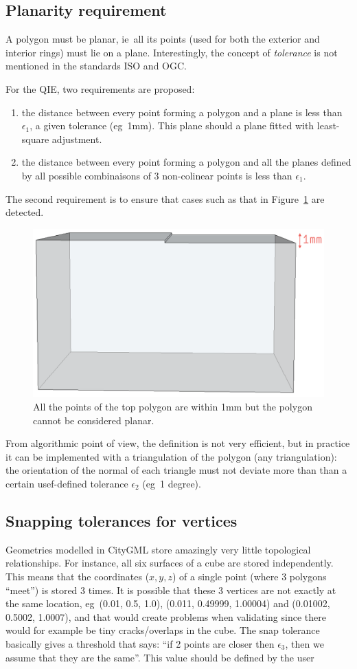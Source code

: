 \documentclass[a4paper,parskip=half,11pt]{scrartcl}
\newcommand{\ie}{ie}
\newcommand{\eg}{eg}
\begin{document}
\subsection{Planarity requirement}

A polygon must be planar, \ie\ all its points (used for both the exterior and interior rings) must lie on a plane.
Interestingly, the concept of \emph{tolerance} is not mentioned in the standards ISO and OGC\@.

For the QIE, two requirements are proposed:
\begin{enumerate}
  \item the distance between every point forming a polygon and a plane is less than $\epsilon_1$, a given tolerance (\eg\ 1mm).
  This plane should a plane fitted with least-square adjustment. 
  \item the distance between every point forming a polygon and all the planes defined by all possible combinaisons of 3 non-colinear points is less than $\epsilon_1$.
\end{enumerate}

The second requirement is to ensure that cases such as that in Figure~\ref{fig:planarity_fold} are detected.
\begin{figure}
  \centering
  \includegraphics[width=0.45\linewidth]{figs/planarity_fold}
  \caption{All the points of the top polygon are within 1mm but the polygon cannot be considered planar.}
\label{fig:planarity_fold}
\end{figure}
From algorithmic point of view, the definition is not very efficient, but in practice it can be implemented with a triangulation of the polygon (any triangulation): the orientation of the normal of each triangle must not deviate more than than a certain usef-defined tolerance $\epsilon_2$ (\eg\ 1 degree).


\subsection{Snapping tolerances for vertices}
Geometries modelled in CityGML store amazingly very little topological relationships. 
For instance, all six surfaces of a cube are stored independently. 
This means that the coordinates ($x,y,z$) of a single point (where 3 polygons ``meet'') is stored 3 times. 
It is possible that these 3 vertices are not exactly at the same location, \eg\ (0.01, 0.5, 1.0), (0.011, 0.49999, 1.00004) and (0.01002, 0.5002, 1.0007), and that would create problems when validating since there would for example be tiny cracks/overlaps in the cube.
The snap tolerance basically gives a threshold that says: ``if 2 points are closer then $\epsilon_3$, then we assume that they are the same''.
This value should be defined by the user
\end{document}
